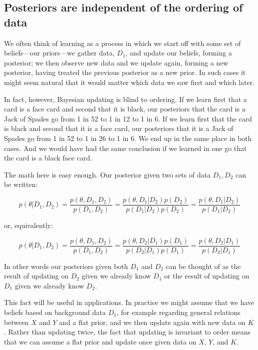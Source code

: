 \documentclass[
  12pt,
]{book}
\begin{document}
\hypertarget{posteriors-are-independent-of-the-ordering-of-data}{%
\subsection{Posteriors are independent of the ordering of data}\label{posteriors-are-independent-of-the-ordering-of-data}}

We often think of learning as a process in which we start off with some set of beliefs---our priors---we gather data, \(D_1\), and update our beliefs, forming a posterior; we then observe new data and we update again, forming a new posterior, having treated the previous posterior as a new prior. In such cases it might seem natural that it would matter which data we saw first and which later.

In fact, however, Bayesian updating is blind to ordering. If we learn first that a card is a face card and second that it is black, our posteriors that the card is a Jack of Spades go from 1 in 52 to 1 in 12 to 1 in 6. If we learn first that the card is black and second that it is a face card, our posteriors that it is a Jack of Spades go from 1 in 52 to 1 in 26 to 1 in 6. We end up in the same place in both cases. And we would have had the same conclusion if we learned in one go that the card is a black face card.

The math here is easy enough. Our posterior given two sets of data \(D_1, D_2\) can be written:

\[p(\theta | D_1, D_2) = \frac{p(\theta, D_1, D_2)}{p(D_1, D_2)} = \frac{p(\theta, D_1 | D_2)p(D_2)}{p(D_1 | D_2)p(D_2)}= \frac{p(\theta, D_1 | D_2)}{p(D_1 | D_2)}\]

or, equivalently:

\[p(\theta | D_1, D_2) = \frac{p(\theta, D_1, D_2)}{p(D_1, D_2)} = \frac{p(\theta, D_2 | D_1)p(D_1)}{p(D_2 | D_1)p(D_1)}= \frac{p(\theta, D_2 | D_1)}{p(D_2 | D_1)}\]

In other words our posteriors given both \(D_1\) and \(D_2\) can be thought of as the result of updating on \(D_2\) given we already know \(D_1\) or the result of updating on \(D_1\) given we already know \(D_2\).

This fact will be useful in applications. In practice we might assume that we have beliefs based on background data \(D_1\), for example regarding general relations between \(X\) and \(Y\) and a flat prior, and we then update again with new data on \(K\). Rather than updating twice, the fact that updating is invariant to order means that we can assume a flat prior and update once given data on \(X\), \(Y\), and \(K\).
\end{document}
